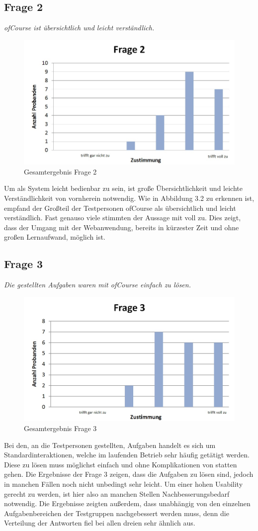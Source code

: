 \subsection{Frage 2}
\begin{center}
	{\it ofCourse ist übersichtlich und leicht verständlich.}
\end{center}
\begin{figure}[h]
\centering
\includegraphics[width=0.7\linewidth]{img/Frage2}
\caption{Gesamtergebnis Frage 2}
\label{fig:Frage2}
\end{figure}
Um als System leicht bedienbar zu sein, ist große Übersichtlichkeit und leichte Verständlichkeit von vornherein notwendig. Wie in Abbildung 3.2 zu erkennen ist, empfand der Großteil der Testpersonen ofCourse als übersichtlich und leicht verständlich. Fast genauso viele stimmten der Aussage mit voll zu. Dies zeigt, dass der Umgang mit der Webanwendung, bereits in kürzester Zeit und ohne großen Lernaufwand, möglich ist.
\newpage
\subsection{Frage 3}
\begin{center}
	{\it Die gestellten Aufgaben waren mit ofCourse einfach zu lösen.}
\end{center}
\begin{figure}[h]
\centering
\includegraphics[width=0.7\linewidth]{img/Frage3}
\caption{Gesamtergebnis Frage 3}
\label{fig:Frage3}
\end{figure}
Bei den, an die Testpersonen gestellten, Aufgaben handelt es sich um Standardinteraktionen, welche im laufenden Betrieb sehr häufig getätigt werden. Diese zu lösen muss möglichst einfach und ohne Komplikationen von statten gehen. Die Ergebnisse der Frage 3 zeigen, dass die Aufgaben zu lösen sind, jedoch in manchen Fällen noch nicht unbedingt sehr leicht. Um einer hohen Usability gerecht zu werden, ist hier also an manchen Stellen Nachbesserungsbedarf notwendig. Die Ergebnisse zeigten außerdem, dass unabhängig von den einzelnen Aufgabenbereichen der Testgruppen nachgebessert werden muss, denn die Verteilung der Antworten fiel bei allen dreien sehr ähnlich aus.
\newpage
